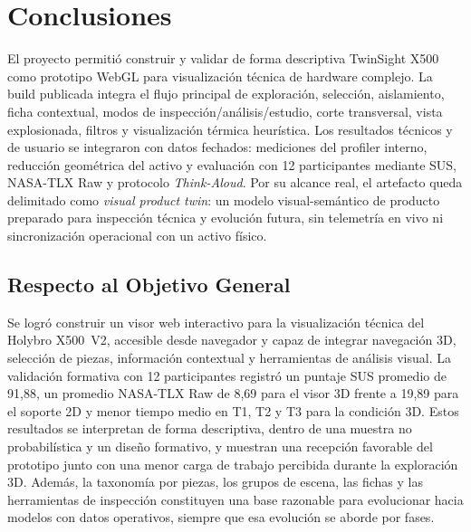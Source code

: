 
\section{Conclusiones}

El proyecto permitió construir y validar de forma descriptiva TwinSight X500 como prototipo WebGL para visualización técnica de hardware complejo. La build publicada integra el flujo principal de exploración, selección, aislamiento, ficha contextual, modos de inspección/análisis/estudio, corte transversal, vista explosionada, filtros y visualización térmica heurística. Los resultados técnicos y de usuario se integraron con datos fechados: mediciones del profiler interno, reducción geométrica del activo y evaluación con 12 participantes mediante SUS, NASA-TLX Raw y protocolo \textit{Think-Aloud}. Por su alcance real, el artefacto queda delimitado como \textit{visual product twin}: un modelo visual-semántico de producto preparado para inspección técnica y evolución futura, sin telemetría en vivo ni sincronización operacional con un activo físico.

\subsection{Respecto al Objetivo General}

Se logró construir un visor web interactivo para la visualización técnica del Holybro X500~V2, accesible desde navegador y capaz de integrar navegación 3D, selección de piezas, información contextual y herramientas de análisis visual. La validación formativa con 12 participantes registró un puntaje SUS promedio de 91,88, un promedio NASA-TLX Raw de 8,69 para el visor 3D frente a 19,89 para el soporte 2D y menor tiempo medio en T1, T2 y T3 para la condición 3D. Estos resultados se interpretan de forma descriptiva, dentro de una muestra no probabilística y un diseño formativo, y muestran una recepción favorable del prototipo junto con una menor carga de trabajo percibida durante la exploración 3D. Además, la taxonomía por piezas, los grupos de escena, las fichas y las herramientas de inspección constituyen una base razonable para evolucionar hacia modelos con datos operativos, siempre que esa evolución se aborde por fases.

